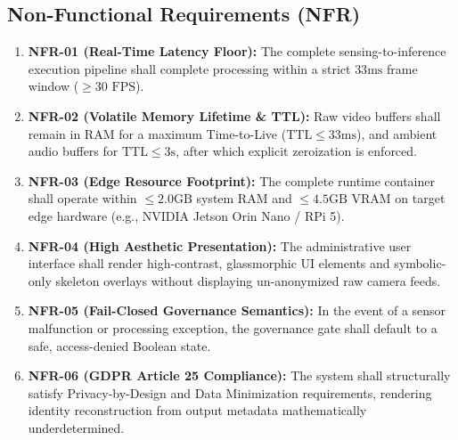 \documentclass[12pt,a4paper,oneside]{report}
\begin{document}
\subsection{Non-Functional Requirements (NFR)}
\begin{enumerate}
    \item \textbf{NFR-01 (Real-Time Latency Floor):} The complete sensing-to-inference execution pipeline shall complete processing within a strict $33\text{ms}$ frame window ($\ge 30\text{ FPS}$).
    \item \textbf{NFR-02 (Volatile Memory Lifetime & TTL):} Raw video buffers shall remain in RAM for a maximum Time-to-Live ($\text{TTL} \le 33\text{ms}$), and ambient audio buffers for $\text{TTL} \le 3\text{s}$, after which explicit zeroization is enforced.
    \item \textbf{NFR-03 (Edge Resource Footprint):} The complete runtime container shall operate within $\le 2.0\text{GB}$ system RAM and $\le 4.5\text{GB}$ VRAM on target edge hardware (e.g., NVIDIA Jetson Orin Nano / RPi 5).
    \item \textbf{NFR-04 (High Aesthetic Presentation):} The administrative user interface shall render high-contrast, glassmorphic UI elements and symbolic-only skeleton overlays without displaying un-anonymized raw camera feeds.
    \item \textbf{NFR-05 (Fail-Closed Governance Semantics):} In the event of a sensor malfunction or processing exception, the governance gate shall default to a safe, access-denied Boolean state.
    \item \textbf{NFR-06 (GDPR Article 25 Compliance):} The system shall structurally satisfy Privacy-by-Design and Data Minimization requirements, rendering identity reconstruction from output metadata mathematically underdetermined.
\end{enumerate}
\end{document}

